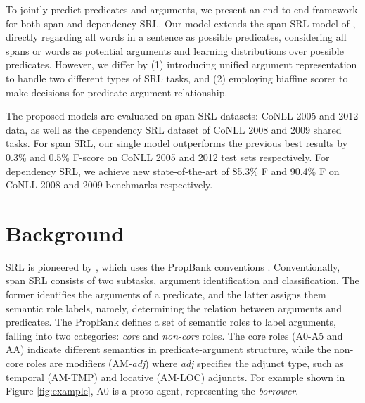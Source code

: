 \documentclass[letterpaper]{article} \usepackage{aaai19}  \usepackage{times}  \usepackage{helvet}  \usepackage{courier}  \usepackage{url}  \usepackage{graphicx}  \frenchspacing  \setlength{\pdfpagewidth}{8.5in}  \setlength{\pdfpageheight}{11in}
\begin{document}
To jointly predict predicates and arguments, we present an end-to-end framework for both span and dependency SRL. Our model extends the span SRL model of \citeauthor{he2018jointly} , directly regarding all words in a sentence as possible predicates, considering all spans or words as potential arguments and learning distributions over possible predicates. However, we differ by (1) introducing unified argument representation to handle two different types of SRL tasks, and (2) employing biaffine scorer to make decisions for predicate-argument relationship. 



The proposed models are evaluated on span SRL datasets: CoNLL 2005 and 2012 data, as well as the dependency SRL dataset of CoNLL 2008 and 2009 shared tasks. For span SRL, our single model outperforms the previous best results by 0.3\% and 0.5\% F-score on CoNLL 2005 and 2012 test sets respectively. For dependency SRL, we achieve new state-of-the-art of 85.3\% F and 90.4\% F on CoNLL 2008 and 2009 benchmarks respectively. 





\section{Background}

SRL is pioneered by \citeauthor{gildea2002} , which uses the PropBank conventions \cite{propbank}.
Conventionally, span SRL consists of two subtasks, argument identification and classification. The former identifies the arguments of a predicate, and the latter assigns them semantic role labels, namely, determining the relation between arguments and predicates. The PropBank defines a set of semantic roles to label arguments, falling into two categories: \textit{core} and \textit{non-core} roles. The core roles (A0-A5 and AA) indicate different semantics in predicate-argument structure, while the non-core roles are modifiers (AM-\textit{adj}) where \textit{adj} specifies the adjunct type, such as temporal (AM-TMP) and locative (AM-LOC) adjuncts. For example shown in Figure \ref{fig:example}, A0 is a proto-agent, representing the \textit{borrower}.
\end{document}
